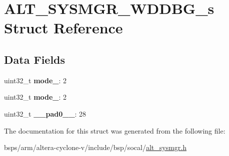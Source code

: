 \hypertarget{structALT__SYSMGR__WDDBG__s}{}\section{A\+L\+T\+\_\+\+S\+Y\+S\+M\+G\+R\+\_\+\+W\+D\+D\+B\+G\+\_\+s Struct Reference}
\label{structALT__SYSMGR__WDDBG__s}
\subsection*{Data Fields}
\begin{DoxyCompactItemize}
\item 
\mbox{\label{structALT__SYSMGR__WDDBG__s_a4e0e36dd9e32363efd3c1256672ad384}} 
uint32\+\_\+t {\bfseries mode\+\_}\+: 2
\item 
\mbox{\label{structALT__SYSMGR__WDDBG__s_ad7e8d067fdcdcfa565917b2d53e23d88}} 
uint32\+\_\+t {\bfseries mode\+\_}\+: 2
\item 
\mbox{\label{structALT__SYSMGR__WDDBG__s_a9b64853ce5ae0da2c68eee8b2063dd59}} 
uint32\+\_\+t {\bfseries \+\_\+\+\_\+pad0\+\_\+\+\_\+}\+: 28
\end{DoxyCompactItemize}


The documentation for this struct was generated from the following file\+:\begin{DoxyCompactItemize}
\item 
bsps/arm/altera-\/cyclone-\/v/include/bsp/socal/\mbox{\hyperlink{alt__sysmgr_8h}{alt\+\_\+sysmgr.\+h}}\end{DoxyCompactItemize}
